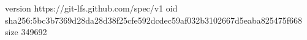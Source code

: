 version https://git-lfs.github.com/spec/v1
oid sha256:5bc3b7369d28da28d38f25cfe592dcdec59af032b3102667d5eaba825475f668
size 349692
